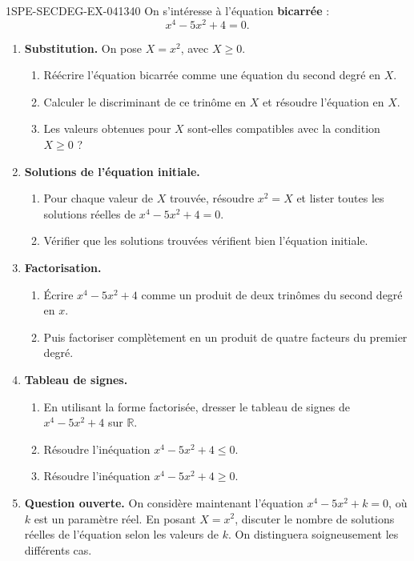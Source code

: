 \begin{exercice}{1SPE-SECDEG-EX-041}{3}{40}
On s'intéresse à l'équation \textbf{bicarrée} :
\[
  x^4 - 5x^2 + 4 = 0.
\]

\begin{enumerate}
  \item \textbf{Substitution.} On pose $X = x^2$, avec $X \geq 0$.
  \begin{enumerate}
    \item Réécrire l'équation bicarrée comme une équation du second degré en $X$.
    \item Calculer le discriminant de ce trinôme en $X$ et résoudre l'équation en $X$.
    \item Les valeurs obtenues pour $X$ sont-elles compatibles avec la condition $X \geq 0$ ?
  \end{enumerate}

  \item \textbf{Solutions de l'équation initiale.}
  \begin{enumerate}
    \item Pour chaque valeur de $X$ trouvée, résoudre $x^2 = X$ et lister toutes les solutions réelles de $x^4 - 5x^2 + 4 = 0$.
    \item Vérifier que les solutions trouvées vérifient bien l'équation initiale.
  \end{enumerate}

  \item \textbf{Factorisation.}
  \begin{enumerate}
    \item Écrire $x^4 - 5x^2 + 4$ comme un produit de deux trinômes du second degré en $x$.
    \item Puis factoriser complètement en un produit de quatre facteurs du premier degré.
  \end{enumerate}

  \item \textbf{Tableau de signes.}
  \begin{enumerate}
    \item En utilisant la forme factorisée, dresser le tableau de signes de $x^4 - 5x^2 + 4$ sur $\mathbb{R}$.
    \item Résoudre l'inéquation $x^4 - 5x^2 + 4 \leq 0$.
    \item Résoudre l'inéquation $x^4 - 5x^2 + 4 \geq 0$.
  \end{enumerate}

  \item \textbf{Question ouverte.} On considère maintenant l'équation $x^4 - 5x^2 + k = 0$, où $k$ est un paramètre réel. En posant $X = x^2$, discuter le nombre de solutions réelles de l'équation selon les valeurs de $k$. On distinguera soigneusement les différents cas.
\end{enumerate}
\end{exercice}
